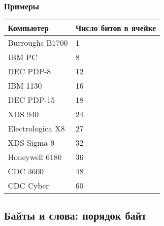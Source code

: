 \begin{frame}[fragile]
\frametitle{Примеры}
\centering
\begin{tabular}{lp{2.1cm}}
    \toprule
    \textbf{Компьютер} & \textbf{Число битов в ячейке}\\
    \midrule
    Burroughs B1700  & 1 \\
    IBM PC           & 8 \\
    DEC PDP-8        & 12\\
    IBM 1130         & 16\\
    DEC PDP-15       & 18\\
    XDS 940          & 24\\
    Electrologica X8 & 27\\
    XDS Sigma 9      & 32\\
    Honeywell 6180   & 36\\
    CDC 3600         & 48\\
    CDC Cyber        & 60\\
    \bottomrule
\end{tabular}

\end{frame}

\subsection {Байты и слова: порядок байт}

